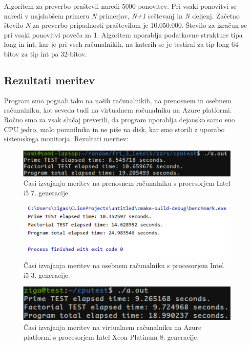 Algoritem za preverbo praštevil naredi 5000 ponovitev. Pri vsaki ponovitvi se naredi v najslabšem primeru \textit{N} primerjav, \textit{N+1} seštevanj in \textit{N} deljenj. Začetno število \textit{N} za preverbo pripadnosti praštevilom je 10.050.000. Število za izračun se pri vsaki ponovitvi poveča za 1. Algoritem uporablja podatkovne strukture tipa long in int, kar je pri vseh računalnikih, na katerih se je testiral za tip long 64-bitov za tip int pa 32-bitov. 



\subsection{Rezultati meritev}

Program smo pognali tako na naših računalnikih, na prenosnem in osebnem računalniku, kot seveda tudi na virtualnem računalniku na Azure platformi. Ročno smo za vsak slučaj preverili, da program uporablja dejansko samo eno CPU jedro, malo pomnilnika in ne piše na disk, kar smo storili z uporabo sistemskega monitorja. Rezultati meritev:

\begin{figure}[H]
	\centering
	\includegraphics[scale=0.66]{Img/3_T_cputest.png}
	\caption{Časi izvajanja meritev na prenosnem računalniku s procesorjem Intel i5 7. generacije.}
	\label{fig:3_cputest1}
\end{figure}

\begin{figure}[H]
	\centering
	\includegraphics[scale=0.8]{Img/3_Z_cputest.png}
	\caption{Časi izvajanja meritev na osebnem računalniku s procesorjem Intel i5 3. generacije.}
	\label{fig:3_cputest2}
\end{figure}

\begin{figure}[H]
	\centering
	\includegraphics[scale=0.66]{Img/3_Azure_cputest.png}
	\caption{Časi izvajanja meritev na virtualnem računalniku na Azure platformi s procesorjem Intel Xeon Platinum 8. generacije.}
	\label{fig:3_cputest3}
\end{figure}

